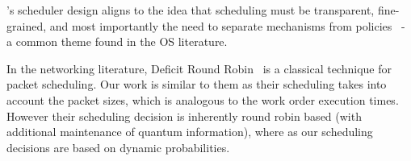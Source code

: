 
\sys{}'s scheduler design aligns to the idea that scheduling must be transparent, fine-grained, and most importantly the need to separate mechanisms from policies~\cite{LampsonS76} - a common theme found in the OS literature.

In the networking literature, Deficit Round Robin~\cite{shreedhar1996efficient} is a classical technique for packet scheduling. 
Our work is similar to them as their scheduling takes into account the packet sizes, which is analogous to the work order execution times.
However their scheduling decision is inherently round robin based (with additional maintenance of quantum information), where as our scheduling decisions are based on dynamic probabilities. 

